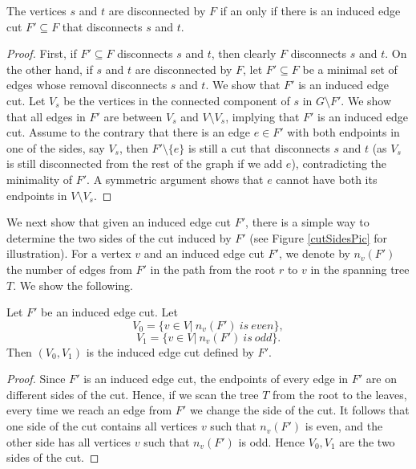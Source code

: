 \begin{claim} \label{obs_induced}
The vertices $s$ and $t$ are disconnected by $F$ if an only if there is an induced edge cut $F' \subseteq F$ that disconnects $s$ and $t$.
\end{claim}

\begin{proof}
First, if $F' \subseteq F$ disconnects $s$ and $t$, then clearly $F$ disconnects $s$ and $t$.
On the other hand, if $s$ and $t$ are disconnected by $F$, let $F' \subseteq F$ be a minimal set of edges whose removal disconnects $s$ and $t$. We show that $F'$ is an induced edge cut. Let $V_s$ be the vertices in the connected component of $s$ in $G \setminus F'$. We show that all edges in $F'$ are between $V_s$ and $V \setminus V_s$, implying that $F'$ is an induced edge cut. Assume to the contrary that there is an edge $e \in F'$ with both endpoints in one of the sides, say $V_s$, then $F' \setminus \{e\}$ is still a cut that disconnects $s$ and $t$ (as $V_s$ is still disconnected from the rest of the graph if we add $e$), contradicting the minimality of $F'$. A symmetric argument shows that $e$ cannot have both its endpoints in $V \setminus V_s$.
\end{proof}

We next show that given an induced edge cut $F'$, there is a simple way to determine the two sides of the cut induced by $F'$ (see Figure \ref{cutSidesPic} for illustration). For a vertex $v$ and an induced edge cut $F'$, we denote by $n_v(F')$ the number of edges from $F'$ in the path from the root $r$ to $v$ in the spanning tree $T$. We show the following.


\begin{claim} \label{obs_cut_sides}
Let $F'$ be an induced edge cut. Let $$V_0=\{v \in V|\ n_v(F')\ is \ even \},$$ $$V_1=\{v \in V|\ n_v(F')\ is \ odd \}.$$ Then $(V_0,V_1)$ is the induced edge cut defined by $F'$.
\end{claim}

\begin{proof}
Since $F'$ is an induced edge cut, the endpoints of every edge in $F'$ are on different sides of the cut. Hence, if we scan the tree $T$ from the root to the leaves, every time we reach an edge from $F'$ we change the side of the cut. It follows that one side of the cut contains all vertices $v$ such that $n_v(F')$ is even, and the other side has all vertices $v$ such that $n_v(F')$ is odd. Hence $V_0,V_1$ are the two sides of the cut.
\end{proof}


